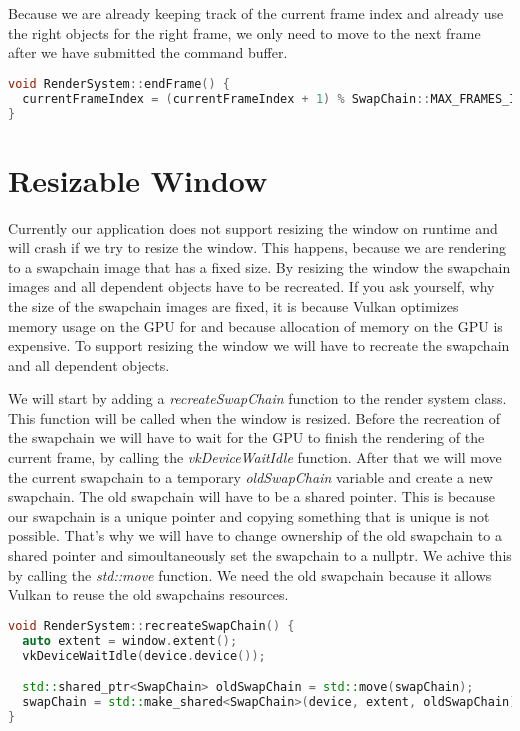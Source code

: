 \documentclass[12pt]{report} \usepackage{preamble}
\begin{document}
Because we are already keeping track of the current frame index and already use the right objects for the right frame, we only need to
move to the next frame after we have submitted the command buffer.

\begin{lstlisting}[language=C++]
void RenderSystem::endFrame() {
  currentFrameIndex = (currentFrameIndex + 1) % SwapChain::MAX_FRAMES_IN_FLIGHT;
}
\end{lstlisting}

\section{Resizable Window}

Currently our application does not support resizing the window on runtime and will crash if we try to resize the window. This
happens, because we are rendering to a swapchain image that has a fixed size. By resizing the window the swapchain images and all
dependent objects have to be recreated. If you ask yourself, why the size of the swapchain images are fixed, it is because
Vulkan optimizes memory usage on the GPU for and because allocation of memory on the GPU is expensive. To support resizing the window
we will have to recreate the swapchain and all dependent objects.

We will start by adding a \textit{recreateSwapChain} function to the render system class. This function will be called when the window is resized.
Before the recreation of the swapchain we will have to wait for the GPU to finish the rendering of the current frame, by calling the
\textit{vkDeviceWaitIdle} function. After that we will move the current swapchain to a temporary \textit{oldSwapChain} variable and create a new swapchain.
The old swapchain will have to be a shared pointer. This is because our swapchain is a unique pointer and copying something that is unique is not possible.
That's why we will have to change ownership of the old swapchain to a shared pointer and simoultaneously set the swapchain to a nullptr.
We achive this by calling the \textit{std::move} function. We need the old swapchain because it allows Vulkan to reuse the old swapchains resources.

\begin{lstlisting}[language=C++]
void RenderSystem::recreateSwapChain() {
  auto extent = window.extent();
  vkDeviceWaitIdle(device.device());

  std::shared_ptr<SwapChain> oldSwapChain = std::move(swapChain);
  swapChain = std::make_shared<SwapChain>(device, extent, oldSwapChain);
}
\end{lstlisting}
\end{document}
